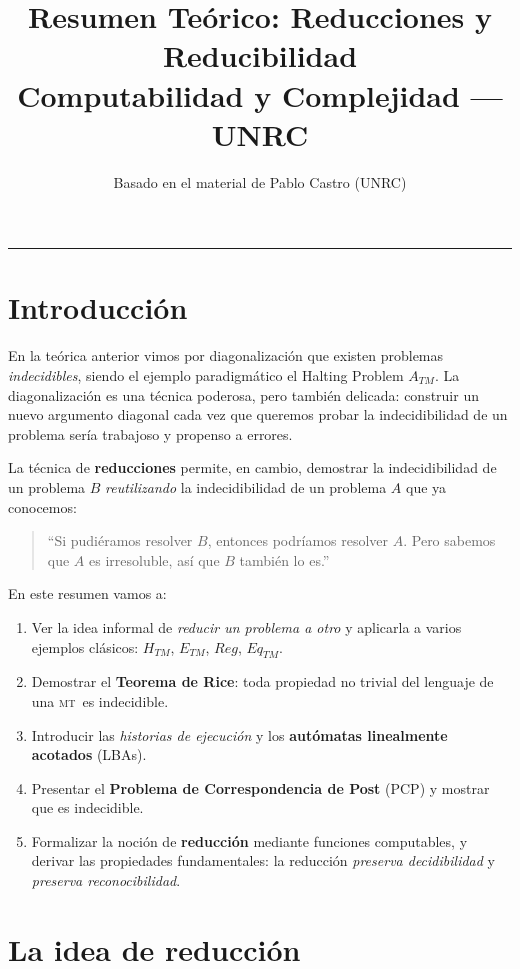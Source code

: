 \documentclass[11pt,a4paper]{article}
\title{\textbf{Resumen Teórico: Reducciones y Reducibilidad}\\[0.3em]
\large Computabilidad y Complejidad --- UNRC}
\author{Basado en el material de Pablo Castro (UNRC)}
\date{}
\theoremstyle{definicion}
\newcommand{\MT}{\textsc{mt}}
\begin{document}
\maketitle

\tableofcontents

\vspace{1em}
\hrule
\vspace{1em}

\section{Introducción}

En la teórica anterior vimos por diagonalización que existen problemas \emph{indecidibles}, siendo el ejemplo paradigmático el Halting Problem $A_{TM}$. La diagonalización es una técnica poderosa, pero también delicada: construir un nuevo argumento diagonal cada vez que queremos probar la indecidibilidad de un problema sería trabajoso y propenso a errores.

La técnica de \textbf{reducciones} permite, en cambio, demostrar la indecidibilidad de un problema $B$ \emph{reutilizando} la indecidibilidad de un problema $A$ que ya conocemos:
\begin{quote}
``Si pudiéramos resolver $B$, entonces podríamos resolver $A$. Pero sabemos que $A$ es irresoluble, así que $B$ también lo es.''
\end{quote}

En este resumen vamos a:
\begin{enumerate}
    \item Ver la idea informal de \emph{reducir un problema a otro} y aplicarla a varios ejemplos clásicos: $H_{TM}$, $E_{TM}$, $Reg$, $Eq_{TM}$.
    \item Demostrar el \textbf{Teorema de Rice}: toda propiedad no trivial del lenguaje de una \MT\ es indecidible.
    \item Introducir las \emph{historias de ejecución} y los \textbf{autómatas linealmente acotados} (LBAs).
    \item Presentar el \textbf{Problema de Correspondencia de Post} (PCP) y mostrar que es indecidible.
    \item Formalizar la noción de \textbf{reducción} mediante funciones computables, y derivar las propiedades fundamentales: la reducción \emph{preserva decidibilidad} y \emph{preserva reconocibilidad}.
\end{enumerate}

\section{La idea de reducción}
\end{document}
